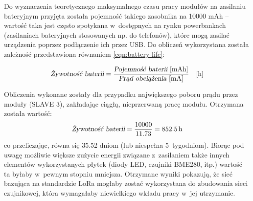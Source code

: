 Do wyznaczenia teoretycznego maksymalnego czasu pracy modułów na zasilaniu bateryjnym przyjęta została pojemność takiego
zasobnika na 10000 mAh -- wartość taka jest często spotykana w~dostępnych na rynku powerbankach (zasilaniach
bateryjnych stosowanych np. do telefonów), które mogą zasilać urządzenia poprzez podłączenie ich przez USB. Do obliczeń
wykorzystana została zależność przedstawiona równaniem \ref{eqn:battery-life}:

\begin{equation}\label{eqn:battery-life}
    \textsl{Żywotność baterii} = \frac{\textsl{Pojemność baterii}\ \text{[mAh]}}{\textsl{Prąd obciążenia}\ \text{[mA]}}\quad\text{[h]}
\end{equation}

Obliczenia wykonane zostały dla przypadku największego poboru prądu przez moduły (SLAVE 3), zakładając ciągłą,
nieprzerwaną pracę modułu. Otrzymana została wartość:
\begin{equation*}
    \textsl{Żywotność baterii} = \frac{10000}{11.73} = 852.5\,\text{h}
\end{equation*}
co przeliczając, równa się 35.52 dniom (lub niespełna 5~tygodniom). Biorąc pod uwagę możliwie większe zużycie energii
związane z~zasilaniem także innych elementów wykorzystanych płytek (diody LED, czujniki BME280, itp.) wartość ta byłaby
w~pewnym stopniu mniejsza. Otrzymane wyniki pokazują, że sieć bazująca na standardzie LoRa mogłaby zostać wykorzystana
do zbudowania sieci czujnikowej, która wymagałaby niewielkiego wkładu pracy w~jej utrzymanie.